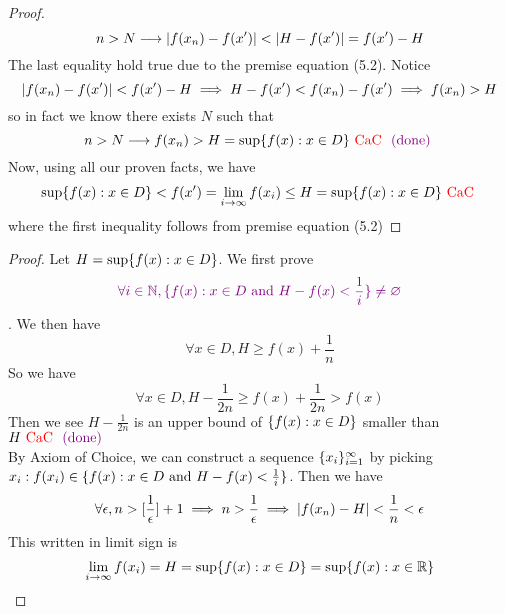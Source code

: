 \documentclass{report}
\begin{document}
\begin{proof}
\begin{equation}
n>N\longrightarrow \abso{f(x_n)-f(x')}<\abso{H - f(x') }=f(x')-H
\end{equation}
The last equality hold true due to the premise equation (5.2). Notice 
\begin{equation}
|f(x_n)-f(x')|<f(x')-H\implies H-f(x')< f(x_n)-f(x')\implies f(x_n)>H
\end{equation}
so in fact we know there exists $N$ such that 
\begin{equation}
n>N \longrightarrow f(x_n)>H= \sup \{ f(x): x \in D \}\text{ \textcolor{red}{CaC} }\textcolor{violet}{\text{ (done) }}
\end{equation}
Now, using all our proven facts, we have
\begin{equation}
\sup \{ f(x): x\in D \}<f(x')=\lim_{i\to \infty }f(x_i)\leq H=\sup \{ f(x): x \in D \}\text{ \textcolor{red}{CaC} }
\end{equation}
where the first inequality follows from premise equation (5.2) 
\end{proof}
\begin{proof}
Let $H=\sup \{ f(x): x \in D \}$. We first prove
\begin{equation}
\textcolor{violet}{\forall i \in \mathbb{N}, \{ f(x): x \in D\text{ and }H-f(x)<\frac{1}{i} \}\neq \varnothing}
\end{equation}
. We then have
\begin{equation}
\forall x\in D, H\geq f(x)+\frac{1}{n}
\end{equation}
So we have
\begin{equation}
\forall x\in D, H-\frac{1}{2n}\geq f(x)+\frac{1}{2n}>f(x)
\end{equation}
Then we see $H-\frac{1}{2n}$ is an upper bound of $\{ f(x): x \in D \}$ smaller than $H\text{ \textcolor{red}{CaC} }\textcolor{violet}{\text{ (done) }}$\\

By Axiom of Choice, we can construct a sequence $\{ x_i \}_{i=1}^\infty$ by picking $x_i: f(x_i)\in \{ f(x):x \in D\text{ and }H-f(x)<\frac{1}{i} \}$. Then we have
\begin{equation}
\forall \epsilon, n> [\frac{1}{\epsilon }]+1\implies n>\frac{1}{\epsilon }\implies |f(x_n)-H|<\frac{1}{n}<\epsilon 
\end{equation}
This written in limit sign is 
\begin{equation}
\lim_{i\to \infty}f(x_i)=H=\sup \{ f(x): x\in D \}=\sup \{ f(x):x \in\mathbb{R} \}
\end{equation}
\end{proof}
\end{document}
